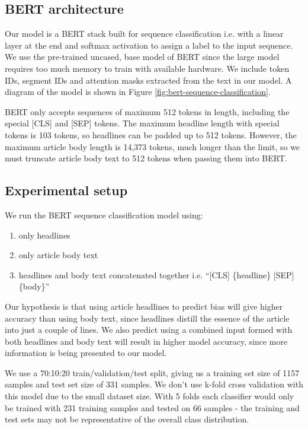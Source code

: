 \subsection{BERT architecture}

Our model is a BERT stack built for sequence classification i.e. with a linear layer at the end and softmax activation to assign a label to the input sequence. We use the pre-trained uncased, base model of BERT since the large model requires too much memory to train with available hardware. We include token IDs, segment IDs and attention masks extracted from the text in our model. A diagram of the model is shown in Figure \ref{fig:bert-sequence-classification}.

BERT only accepts sequences of maximum 512 tokens in length, including the special [CLS] and [SEP] tokens. The maximum headline length with special tokens is 103 tokens, so headlines can be padded up to 512 tokens. However, the maximum article body length is 14,373 tokens, much longer than the limit, so we must truncate article body text to 512 tokens when passing them into BERT.

\subsection{Experimental setup}

We run the BERT sequence classification model using:

\begin{enumerate}
    \item only headlines
    \item only article body text
    \item headlines and body text concatenated together i.e. ``[CLS] \{headline\} [SEP] \{body\}''
\end{enumerate}

Our hypothesis is that using article headlines to predict bias will give higher accuracy than using body text, since headlines distill the essence of the article into just a couple of lines. We also predict using a combined input formed with both headlines and body text will result in higher model accuracy, since more information is being presented to our model.

We use a 70:10:20 train/validation/test split, giving us a training set size of 1157 samples and test set size of 331 samples. We don't use k-fold cross validation with this model due to the small dataset size. With 5 folds each classifier would only be trained with 231 training samples and tested on 66 samples - the training and test sets may not be representative of the overall class distribution.

